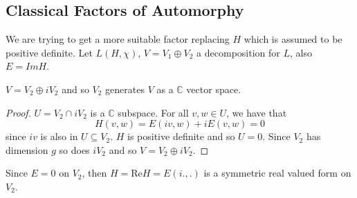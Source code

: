 \subsection{Classical Factors of Automorphy}
\begin{paragraph}
{} We are trying to get a more suitable factor replacing $H$ which is assumed to be positive definite. Let $L(H,\chi)$, $V=V_1\oplus V_2$ a decomposition for $L$, also $E=Im H$. 
\begin{lemma}
$V=V_2\oplus i V_2$ and so $V_2$ generates $V$ as a $\mathbb{C}$ vector space. 
\end{lemma}
\begin{proof}
$U=V_2\cap i V_2 $ is a $\mathbb{C}$ subspace. For all $v,w\in U$, we have that 
\begin{equation*}
H(v,w)=E(iv,w)+iE(v,w)=0
\end{equation*}
since $iv$ is also in $U\subseteq V_2$. $H$ is positive definite and so $U=0$. Since $V_2$ has dimension $g$ so does $iV_2$ and so $V=V_2\oplus i V_2$.
\end{proof}
Since $E=0$ on $V_2$, then $H=\text{Re} H=E(i.,.)$ is a symmetric real valued form on $V_2$. 
\end{paragraph}
